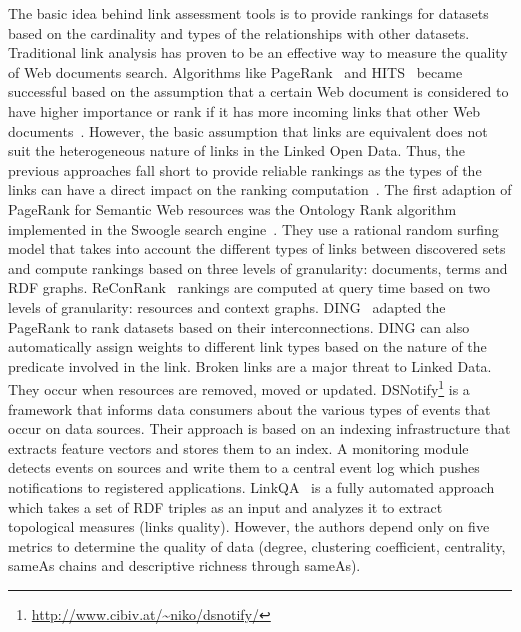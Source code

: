 \documentclass[onecolumn, crcready]{../../Tools/LaTEX/iosart2c}
\begin{document}
The basic idea behind link assessment tools is to provide rankings for datasets based on the cardinality and types of the relationships with other datasets. Traditional link analysis has proven to be an effective way to measure the quality of Web documents search. Algorithms like PageRank~\cite{Page:TechReport:98} and HITS~\cite{Kleinberg:ACM:99} became successful based on the assumption that a certain Web document is considered to have higher importance or rank if it has more incoming links that other Web documents~\cite{Brin:WWW:98}\cite{Chakrabarti:IEEE:99}. However, the basic assumption that links are equivalent does not suit the heterogeneous nature of links in the Linked Open Data. Thus, the previous approaches fall short to provide reliable rankings as the types of the links can have a direct impact on the ranking computation~\cite{Toupikov:LDOW:09}. The first adaption of PageRank for Semantic Web resources was the Ontology Rank algorithm implemented in the Swoogle search engine~\cite{Ding:CIKM:04}. They use a rational random surfing model that takes into account the different types of links between discovered sets and compute rankings based on three levels of granularity: documents, terms and RDF graphs. ReConRank~\cite{Hogan:SSKB:06} rankings are computed at query time based on two levels of granularity: resources and context graphs. DING~\cite{Toupikov:LDOW:09} adapted the PageRank to rank datasets based on their interconnections. DING can also automatically assign weights to different link types based on the nature of the predicate involved in the link. Broken links are a major threat to Linked Data. They occur when resources are removed, moved or updated. DSNotify\footnote{\url{http://www.cibiv.at/~niko/dsnotify/}}\cite{Haslhofer:IWS:09} is a framework that informs data consumers about the various types of events that occur on data sources. Their approach is based on an indexing infrastructure that extracts feature vectors and stores them to an index. A monitoring module detects events on sources and write them to a central event log which pushes notifications to registered applications. LinkQA~\cite{Gueret:ESWC:12} is a fully automated approach which takes a set of RDF triples as an input and analyzes it to extract topological measures (links quality). However, the authors depend only on five metrics to determine the quality of data (degree, clustering coefficient, centrality, sameAs chains and descriptive richness through sameAs).\\

\end{document}
